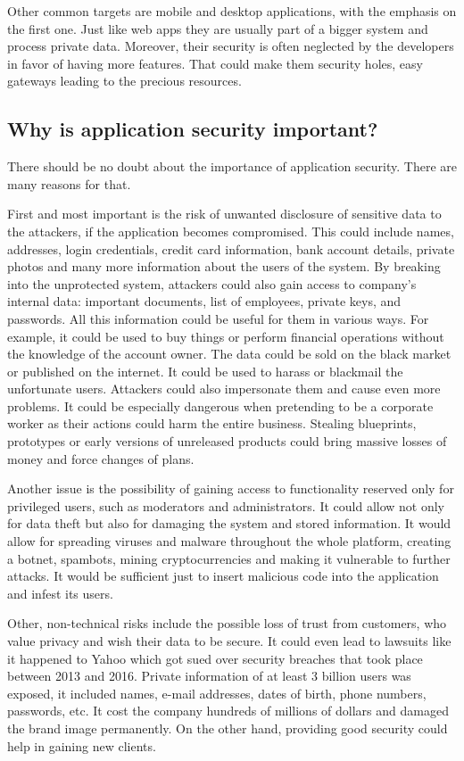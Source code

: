\documentclass[a4paper]{article}
\begin{document}
Other common targets are mobile and desktop applications, with the emphasis on
the first one. Just like web apps they are usually part of a bigger system and
process private data. Moreover, their security is often neglected by the
developers in favor of having more features. That could make them security
holes, easy gateways leading to the precious resources. 

\newpage

\subsection{Why is application security important?}

There should be no doubt about the importance of application security. There are
many reasons for that.

First and most important is the risk of unwanted disclosure of sensitive data to
the attackers, if the application becomes compromised. This could include names,
addresses, login credentials, credit card information, bank account details,
private photos and many more information about the users of the system. By
breaking into the unprotected system, attackers could also gain access to
company's internal data: important documents, list of employees, private keys,
and passwords. All this information could be useful for them in various ways.
For example, it could be used to buy things or perform financial operations
without the knowledge of the account owner. The data could be sold on the black
market or published on the internet. It could be used to harass or blackmail the
unfortunate users. Attackers could also impersonate them and cause even more
problems. It could be especially dangerous when pretending to be a corporate
worker as their actions could harm the entire business. Stealing blueprints,
prototypes or early versions of unreleased products could bring massive
losses of money and force changes of plans.

Another issue is the possibility of gaining access to functionality reserved
only for privileged users, such as moderators and administrators. It could allow
not only for data theft but also for damaging the system and stored
information. It would allow for spreading viruses and malware throughout the
whole platform, creating a botnet, spambots, mining cryptocurrencies and making
it vulnerable to further attacks. It would be sufficient just to insert
malicious code into the application and infest its users.

Other, non-technical risks include the possible loss of trust from customers,
who value privacy and wish their data to be secure. It could even lead to
lawsuits like it happened to Yahoo which got sued over security breaches that 
took place between 2013 and 2016. Private information of at least 3 billion 
users was exposed, it included names, e-mail addresses, dates of birth,
phone numbers, passwords, etc. It cost the company hundreds of millions of
dollars and damaged the brand image permanently. On the other hand, providing
good security could help in gaining new clients.
\end{document}
